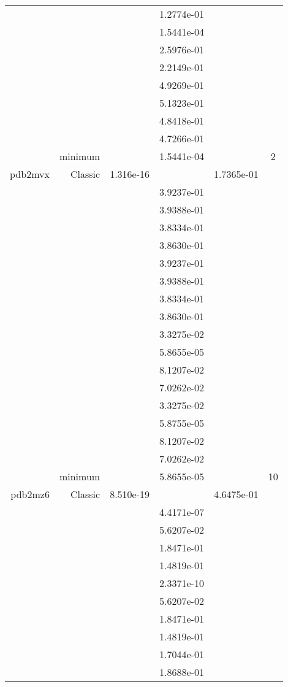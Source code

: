 \begin{xltabular}{\textwidth}{r|rS[table-format=1.3e+2]S[table-format=1.4e+2]S[table-format=1.4e+2]S[table-format=-1.5]}
&  &  & 1.2774e-01 & & \\
&  &  & 1.5441e-04 & & \\
&  &  & 2.5976e-01 & & \\
&  &  & 2.2149e-01 & & \\
&  &  & 4.9269e-01 & & \\
&  &  & 5.1323e-01 & & \\
&  &  & 4.8418e-01 & & \\
&  &  & 4.7266e-01 & & \\
& minimum &  & 1.5441e-04 & & 2 \\  \addlinespace
pdb2mvx & Classic & 1.316e-16 &  & 1.7365e-01 & \\
&  &  & 3.9237e-01 & & \\
&  &  & 3.9388e-01 & & \\
&  &  & 3.8334e-01 & & \\
&  &  & 3.8630e-01 & & \\
&  &  & 3.9237e-01 & & \\
&  &  & 3.9388e-01 & & \\
&  &  & 3.8334e-01 & & \\
&  &  & 3.8630e-01 & & \\
&  &  & 3.3275e-02 & & \\
&  &  & 5.8655e-05 & & \\
&  &  & 8.1207e-02 & & \\
&  &  & 7.0262e-02 & & \\
&  &  & 3.3275e-02 & & \\
&  &  & 5.8755e-05 & & \\
&  &  & 8.1207e-02 & & \\
&  &  & 7.0262e-02 & & \\
& minimum &  & 5.8655e-05 & & 10 \\  \addlinespace
pdb2mz6 & Classic & 8.510e-19 &  & 4.6475e-01 & \\
&  &  & 4.4171e-07 & & \\
&  &  & 5.6207e-02 & & \\
&  &  & 1.8471e-01 & & \\
&  &  & 1.4819e-01 & & \\
&  &  & 2.3371e-10 & & \\
&  &  & 5.6207e-02 & & \\
&  &  & 1.8471e-01 & & \\
&  &  & 1.4819e-01 & & \\
&  &  & 1.7044e-01 & & \\
&  &  & 1.8688e-01 & & \\

\end{xltabular}
